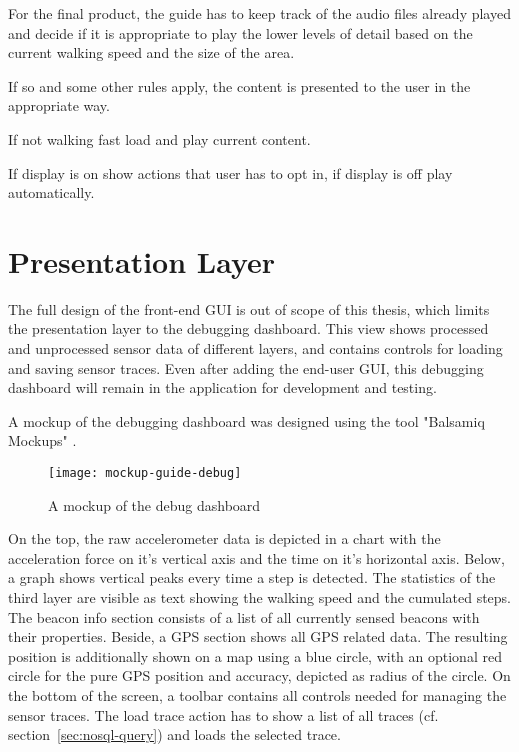 For the final product, the guide has to keep track of the audio files already played and decide if it is appropriate to play the lower levels of detail based on the current walking speed and the size of the area.

If so and some other rules apply, the content is presented to the user in the appropriate way.

If not walking fast load and play current content.

If display is on show actions that user has to opt in, if display is off play automatically. 

\section{Presentation Layer}


The full design of the front-end GUI is out of scope of this thesis, which limits the presentation layer to the debugging dashboard.
This view shows processed and unprocessed sensor data of different layers, and contains controls for loading and saving sensor traces. Even after adding the end-user GUI, this debugging dashboard will remain in the application for development and testing.

A mockup of the debugging dashboard was designed using the tool "Balsamiq Mockups" \cite{balsamiq}.

\begin{figure}[H]
\centering
\texttt{[image: mockup-guide-debug]}
\caption{A mockup of the debug dashboard}
\label{fig:couchbase-query}
\end{figure}

On the top, the raw accelerometer data is depicted in a chart with the acceleration force on it's vertical axis and the time on it's horizontal axis. Below, a graph shows vertical peaks every time a step is detected. The statistics of the third layer are visible as text showing the walking speed and the cumulated steps.
The beacon info section consists of a list of all currently sensed beacons with their properties. Beside, a GPS section shows all GPS related data. The resulting position is additionally shown on a map using a blue circle, with an optional red circle for the pure GPS position and accuracy, depicted as radius of the circle. On the bottom of the screen, a toolbar contains all controls needed for managing the sensor traces. The load trace action has to show a list of all traces (cf. section~\ref{sec:nosql-query}) and loads the selected trace.

